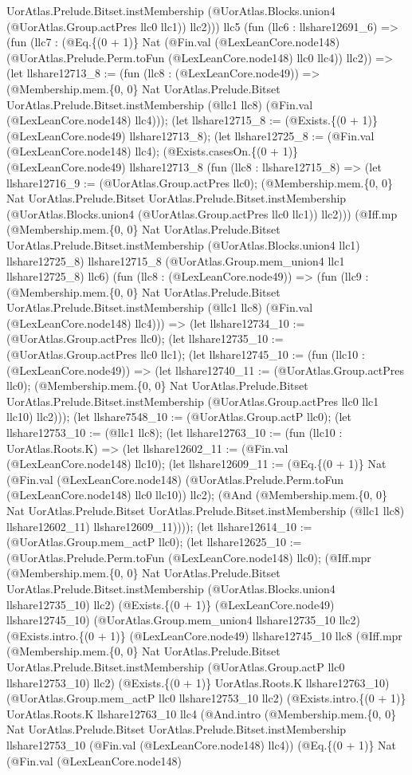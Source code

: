 \documentclass[11pt]{article}
\begin{document}
UorAtlas.Prelude.Bitset.instMembership (@UorAtlas.Blocks.union4 (@UorAtlas.Group.actPres llc0 llc1)) llc2))) llc5 (fun (llc6 : llshare12691\_6) => (fun (llc7 : (@Eq.\{(0 + 1)\} Nat (@Fin.val (@LexLeanCore.node148) (@UorAtlas.Prelude.Perm.toFun (@LexLeanCore.node148) llc0 llc4)) llc2)) => (let llshare12713\_8 := (fun (llc8 : (@LexLeanCore.node49)) => (@Membership.mem.\{0, 0\} Nat UorAtlas.Prelude.Bitset UorAtlas.Prelude.Bitset.instMembership (@llc1 llc8) (@Fin.val (@LexLeanCore.node148) llc4))); (let llshare12715\_8 := (@Exists.\{(0 + 1)\} (@LexLeanCore.node49) llshare12713\_8); (let llshare12725\_8 := (@Fin.val (@LexLeanCore.node148) llc4); (@Exists.casesOn.\{(0 + 1)\} (@LexLeanCore.node49) llshare12713\_8 (fun (llc8 : llshare12715\_8) => (let llshare12716\_9 := (@UorAtlas.Group.actPres llc0); (@Membership.mem.\{0, 0\} Nat UorAtlas.Prelude.Bitset UorAtlas.Prelude.Bitset.instMembership (@UorAtlas.Blocks.union4 (@UorAtlas.Group.actPres llc0 llc1)) llc2))) (@Iff.mp (@Membership.mem.\{0, 0\} Nat UorAtlas.Prelude.Bitset UorAtlas.Prelude.Bitset.instMembership (@UorAtlas.Blocks.union4 llc1) llshare12725\_8) llshare12715\_8 (@UorAtlas.Group.mem\_union4 llc1 llshare12725\_8) llc6) (fun (llc8 : (@LexLeanCore.node49)) => (fun (llc9 : (@Membership.mem.\{0, 0\} Nat UorAtlas.Prelude.Bitset UorAtlas.Prelude.Bitset.instMembership (@llc1 llc8) (@Fin.val (@LexLeanCore.node148) llc4))) => (let llshare12734\_10 := (@UorAtlas.Group.actPres llc0); (let llshare12735\_10 := (@UorAtlas.Group.actPres llc0 llc1); (let llshare12745\_10 := (fun (llc10 : (@LexLeanCore.node49)) => (let llshare12740\_11 := (@UorAtlas.Group.actPres llc0); (@Membership.mem.\{0, 0\} Nat UorAtlas.Prelude.Bitset UorAtlas.Prelude.Bitset.instMembership (@UorAtlas.Group.actPres llc0 llc1 llc10) llc2))); (let llshare7548\_10 := (@UorAtlas.Group.actP llc0); (let llshare12753\_10 := (@llc1 llc8); (let llshare12763\_10 := (fun (llc10 : UorAtlas.Roots.K) => (let llshare12602\_11 := (@Fin.val (@LexLeanCore.node148) llc10); (let llshare12609\_11 := (@Eq.\{(0 + 1)\} Nat (@Fin.val (@LexLeanCore.node148) (@UorAtlas.Prelude.Perm.toFun (@LexLeanCore.node148) llc0 llc10)) llc2); (@And (@Membership.mem.\{0, 0\} Nat UorAtlas.Prelude.Bitset UorAtlas.Prelude.Bitset.instMembership (@llc1 llc8) llshare12602\_11) llshare12609\_11)))); (let llshare12614\_10 := (@UorAtlas.Group.mem\_actP llc0); (let llshare12625\_10 := (@UorAtlas.Prelude.Perm.toFun (@LexLeanCore.node148) llc0); (@Iff.mpr (@Membership.mem.\{0, 0\} Nat UorAtlas.Prelude.Bitset UorAtlas.Prelude.Bitset.instMembership (@UorAtlas.Blocks.union4 llshare12735\_10) llc2) (@Exists.\{(0 + 1)\} (@LexLeanCore.node49) llshare12745\_10) (@UorAtlas.Group.mem\_union4 llshare12735\_10 llc2) (@Exists.intro.\{(0 + 1)\} (@LexLeanCore.node49) llshare12745\_10 llc8 (@Iff.mpr (@Membership.mem.\{0, 0\} Nat UorAtlas.Prelude.Bitset UorAtlas.Prelude.Bitset.instMembership (@UorAtlas.Group.actP llc0 llshare12753\_10) llc2) (@Exists.\{(0 + 1)\} UorAtlas.Roots.K llshare12763\_10) (@UorAtlas.Group.mem\_actP llc0 llshare12753\_10 llc2) (@Exists.intro.\{(0 + 1)\} UorAtlas.Roots.K llshare12763\_10 llc4 (@And.intro (@Membership.mem.\{0, 0\} Nat UorAtlas.Prelude.Bitset UorAtlas.Prelude.Bitset.instMembership llshare12753\_10 (@Fin.val (@LexLeanCore.node148) llc4)) (@Eq.\{(0 + 1)\} Nat (@Fin.val (@LexLeanCore.node148) 
\end{document}
